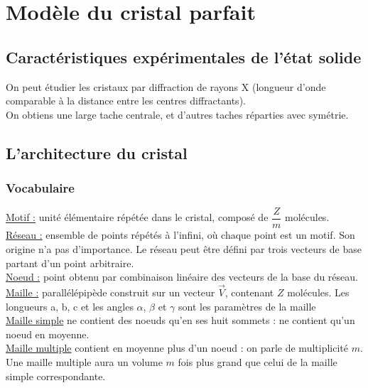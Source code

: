 \documentclass[13pt, twoside, a4paper, french, tikz]{report}
\begin{document}
    \chapter{Modèle du cristal parfait}\label{ch:modele-du-cristal-parfait}


    \section{Caractéristiques expérimentales de l'état solide}\label{sec:caracteristiques-experimentales-de-l'etat-solide}

    On peut étudier les cristaux par diffraction de rayons X (longueur d'onde comparable à la distance entre les centres diffractants).\\
    On obtiens une large tache centrale, et d'autres taches réparties avec symétrie.\\


    \section{L'architecture du cristal}\label{sec:l'architecture-du-cristal}

    \subsection{Vocabulaire}\label{subsec:vocabulaire}

    \underline{Motif :} unité élémentaire répétée dans le cristal, composé de $\dfrac{Z}{m}$ molécules.\\
    \underline{Réseau :} ensemble de points répétés à l'infini, où chaque point est un motif.
    Son origine n'a pas d'importance.
    Le réseau peut être défini par trois vecteurs de base partant d'un point arbitraire.\\
    \underline{Noeud :} point obtenu par combinaison linéaire des vecteurs de la base du réseau.\\
    \underline{Maille :} parallélépipède construit sur un vecteur $\vec V$, contenant $Z$ molécules.
    Les longueurs a, b, c et les angles $\alpha$, $\beta$ et $\gamma$ sont les paramètres de la maille\\
    \underline{Maille simple} ne contient des noeuds qu'en ses huit sommets : ne contient qu'un noeud en moyenne.\\
    \underline{Maille multiple} contient en moyenne plus d'un noeud : on parle de multiplicité $m$.\\
    Une maille multiple aura un volume $m$ fois plus grand que celui de la maille simple correspondante.\\
\end{document}
